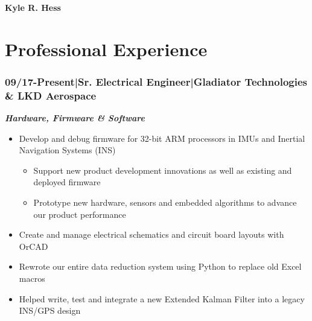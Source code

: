 \documentclass[]{article}
\begin{document}
\noindent\textbf{\huge{Kyle R. Hess}}
\hfill \break
\noindent\makebox[\linewidth]{\rule{\textwidth}{1pt}}



\section*{Professional Experience}

\subsubsection*{09/17-Present\hspace{3 mm}|\hspace{3 mm}Sr. Electrical Engineer\hspace{3 mm}|\hspace{3 mm}Gladiator Technologies \& LKD Aerospace}
\textbf{\emph{Hardware, Firmware \& Software}}
\begin{itemize}
    \setlength\itemsep{0.05em}
    \item Develop and debug firmware for 32-bit ARM processors in IMUs and Inertial Navigation Systems (INS)
    \begin{itemize}
        \setlength\itemsep{0.05em}
        \item Support new product development innovations as well as existing and deployed firmware 
        \item Prototype new hardware, sensors and embedded algorithms to advance our product performance
    \end{itemize}
    \item Create and manage electrical schematics and circuit board layouts with OrCAD
    \item Rewrote our entire data reduction system using Python to replace old Excel macros
    \item Helped write, test and integrate a new Extended Kalman Filter into a legacy INS/GPS design
\end{itemize}
\end{document}
